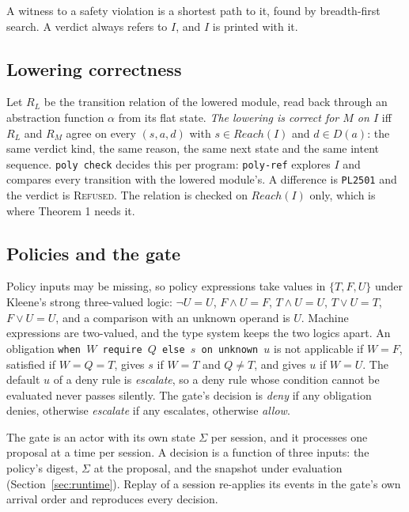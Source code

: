 \documentclass[11pt]{article}
\begin{document}
A witness to a safety violation is a shortest path to it, found by breadth-first search. A verdict always refers to $I$, and $I$ is printed with it.

\subsection{Lowering correctness}
\label{sec:sem-tv}

Let $R_L$ be the transition relation of the lowered module, read back through an abstraction function $\alpha$ from its flat state. \emph{The lowering is correct for $M$ on $I$} iff $R_L$ and $R_M$ agree on every $(s, a, d)$ with $s \in \mathit{Reach}(I)$ and $d \in D(a)$: the same verdict kind, the same reason, the same next state and the same intent sequence. \texttt{poly check} decides this per program: \texttt{poly-ref} explores $I$ and compares every transition with the lowered module's. A difference is \texttt{PL2501} and the verdict is \textsc{Refused}. The relation is checked on $\mathit{Reach}(I)$ only, which is where Theorem 1 needs it.

\subsection{Policies and the gate}

Policy inputs may be missing, so policy expressions take values in $\{T, F, U\}$ under Kleene's strong three-valued logic: $\neg U = U$, $F \wedge U = F$, $T \wedge U = U$, $T \vee U = T$, $F \vee U = U$, and a comparison with an unknown operand is $U$. Machine expressions are two-valued, and the type system keeps the two logics apart. An obligation \texttt{when $W$ require $Q$ else $s$ on unknown $u$} is not applicable if $W = F$, satisfied if $W = Q = T$, gives $s$ if $W = T$ and $Q \ne T$, and gives $u$ if $W = U$. The default $u$ of a deny rule is \emph{escalate}, so a deny rule whose condition cannot be evaluated never passes silently. The gate's decision is \emph{deny} if any obligation denies, otherwise \emph{escalate} if any escalates, otherwise \emph{allow}.

The gate is an actor with its own state $\Sigma$ per session, and it processes one proposal at a time per session. A decision is a function of three inputs: the policy's digest, $\Sigma$ at the proposal, and the snapshot under evaluation (Section~\ref{sec:runtime}). Replay of a session re-applies its events in the gate's own arrival order and reproduces every decision.
\end{document}
